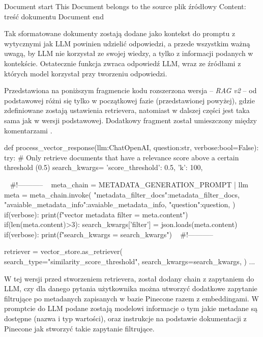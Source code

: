 \documentclass[
a4paper,
12pt,
]{article}
\newcounter{subsubsubsection}[subsubsection]
\begin{document}
\begin{codestyle}
Document start
This Document belongs to the source {plik źródłowy}
Content: {treść dokumentu}
Document end
\end{codestyle}

\noindent{}Tak sformatowane dokumenty zostają dodane jako kontekst do promptu z wytycznymi jak LLM powinien udzielić odpowiedzi, a przede wszystkim ważną uwagą, by LLM nie korzystał ze swojej wiedzy, a tylko z informacji podanych w kontekście.
% 
Ostatecznie funkcja zwraca odpowiedź LLM, wraz ze źródłami z których model korzystał przy tworzeniu odpowiedzi.


Przedstawiona na poniższym fragmencie kodu rozszerzona wersja -- \textit{RAG v2} -- od podstawowej różni się tylko w początkowej fazie (przedstawionej powyżej), gdzie zdefiniowane zostają ustawienia retrievera, natomiast w dalszej części jest taka sama jak w wersji podstawowej. Dodatkowy fragment został umieszczony między komentarzami 
.

\begin{python}
def process_vector_response(llm:ChatOpenAI, question:str, verbose:bool=False):
    try:
        # Only retrieve documents that have a relevance score above a certain threshold (0.5)
        search_kwargs={
            'score_threshold': 0.5, 
            'k': 100,
        }
        
        ~\color{red} \#!----------- ~
        meta_chain = METADATA_GENERATION_PROMPT | llm 
        meta = meta_chain.invoke({
            "metadata_filter_docs":metadata_filter_docs, 
            "avaiable_metadata_info":avaiable_metadata_info,
            "question":question,
        })
        if(verbose):
            print(f"vector metadata filter = {meta.content}")
        if(len(meta.content)>3): 
            search_kwargs['filter'] = json.loads(meta.content)
            if(verbose):
                print(f"search_kwargs = {search_kwargs}")
        ~\color{red} \#!----------- ~

        retriever = vector_store.as_retriever(
            search_type="similarity_score_threshold",
            search_kwargs=search_kwargs,
        )
        ...
\end{python}


\noindent{}W tej wersji przed stworzeniem retrievera, został dodany chain z zapytaniem do LLM, czy dla danego pytania użytkownika można utworzyć dodatkowe zapytanie filtrujące po metadanych zapisanych w bazie Pinecone razem z embeddingami. W promptcie do LLM podane zostają modelowi informacje o tym jakie metadane są dostępne (nazwa i typ wartości), oraz instrukcje na podstawie dokumentacji z Pinecone \cite{pinecone:metatdata} jak stworzyć takie zapytanie filtrujące. 
\end{document}
